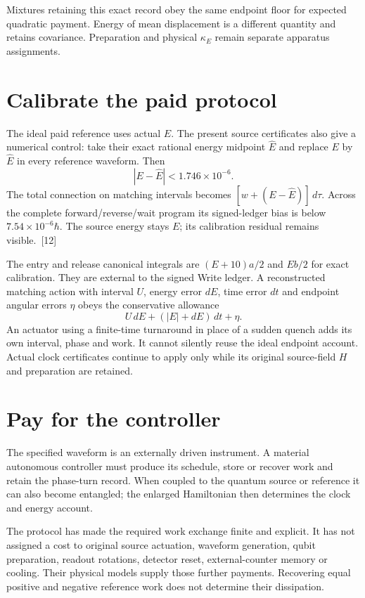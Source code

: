 \documentclass[10pt,twocolumn,letterpaper]{article}
\begin{document}
Mixtures retaining this exact record obey the same endpoint floor for expected quadratic payment. Energy of mean displacement is a different quantity and retains covariance. Preparation and physical $\kappa_E$ remain separate apparatus assignments.

\section{Calibrate the paid protocol}
The ideal paid reference uses actual $E$. The present source certificates also give a numerical control: take their exact rational energy midpoint $\widehat E$ and replace $E$ by $\widehat E$ in every reference waveform. Then
\[
|E-\widehat E|<1.746\times10^{-6}.
\]
The total connection on matching intervals becomes $[w+(E-\widehat E)]\,d\tau$. Across the complete forward/reverse/wait program its signed-ledger bias is below $7.54\times10^{-6}\hbar$. The source energy stays $E$; its calibration residual remains visible.~[12]

The entry and release canonical integrals are $(E+10)a/2$ and $Eb/2$ for exact calibration. They are external to the signed Write ledger. A reconstructed matching action with interval $U$, energy error $dE$, time error $dt$ and endpoint angular errors $\eta$ obeys the conservative allowance
\[
U\,dE+(|E|+dE)\,dt+\eta.
\]
An actuator using a finite-time turnaround in place of a sudden quench adds its own interval, phase and work. It cannot silently reuse the ideal endpoint account. Actual clock certificates continue to apply only while its original source-field $H$ and preparation are retained.

\section{Pay for the controller}
The specified waveform is an externally driven instrument. A material autonomous controller must produce its schedule, store or recover work and retain the phase-turn record. When coupled to the quantum source or reference it can also become entangled; the enlarged Hamiltonian then determines the clock and energy account.

The protocol has made the required work exchange finite and explicit. It has not assigned a cost to original source actuation, waveform generation, qubit preparation, readout rotations, detector reset, external-counter memory or cooling. Their physical models supply those further payments. Recovering equal positive and negative reference work does not determine their dissipation.
\end{document}
